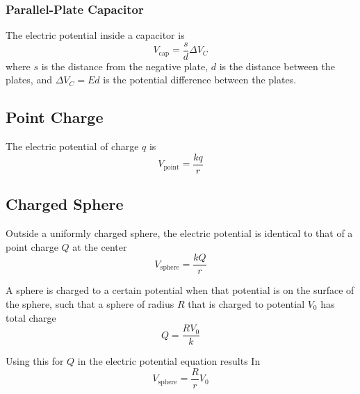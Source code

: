 \documentclass{article}
\begin{document}
\subsubsection*{Parallel-Plate Capacitor}
The electric potential inside a capacitor is
\[V_\text{cap}=\frac{s}{d}\Delta V_C\]
where $s$ is the distance from the negative plate, $d$ is the distance between the plates, and
$\Delta V_C=Ed$ is the potential difference between the plates.

\subsection*{Point Charge}
The electric potential of charge $q$ is
\[V_\text{point}=\frac{kq}{r}\]

\subsection*{Charged Sphere}
Outside a uniformly charged sphere, the electric potential is identical to that of a point charge
$Q$ at the center
\[V_\text{sphere}=\frac{kQ}{r}\]

A sphere is charged to a certain potential when that potential is on the surface of the sphere,
such that a sphere of radius $R$ that is charged to potential $V_0$ has total charge
\[Q=\frac{RV_0}{k}\]

Using this for $Q$ in the electric potential equation results In
\[V_\text{sphere}=\frac{R}{r}V_0\]
\end{document}
